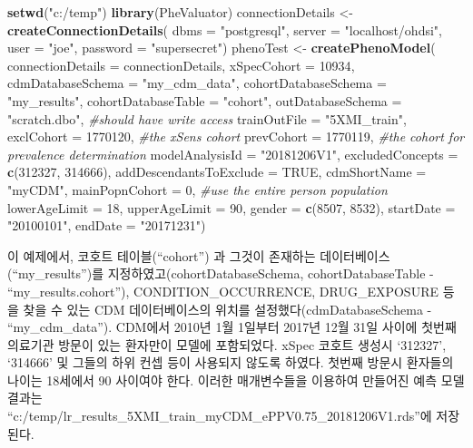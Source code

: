 \documentclass[10.5pt]{book}
\newenvironment{Shaded}{\begin{snugshade}}{\end{snugshade}}
\newcommand{\KeywordTok}[1]{\textcolor[rgb]{0.13,0.29,0.53}{\textbf{#1}}}
\newcommand{\DataTypeTok}[1]{\textcolor[rgb]{0.13,0.29,0.53}{#1}}
\newcommand{\DecValTok}[1]{\textcolor[rgb]{0.00,0.00,0.81}{#1}}
\newcommand{\StringTok}[1]{\textcolor[rgb]{0.31,0.60,0.02}{#1}}
\newcommand{\CommentTok}[1]{\textcolor[rgb]{0.56,0.35,0.01}{\textit{#1}}}
\newcommand{\OtherTok}[1]{\textcolor[rgb]{0.56,0.35,0.01}{#1}}
\newcommand{\NormalTok}[1]{#1}
\theoremstyle{definition}
\theoremstyle{definition}
\theoremstyle{definition}
\theoremstyle{remark}
\begin{document}
\begin{Shaded}
\begin{Highlighting}[]
\KeywordTok{setwd}\NormalTok{(}\StringTok{"c:/temp"}\NormalTok{)}
\KeywordTok{library}\NormalTok{(PheValuator)}
\NormalTok{connectionDetails <-}\StringTok{ }\KeywordTok{createConnectionDetails}\NormalTok{(}
  \DataTypeTok{dbms =} \StringTok{"postgresql"}\NormalTok{,}
  \DataTypeTok{server =} \StringTok{"localhost/ohdsi"}\NormalTok{,}
  \DataTypeTok{user =} \StringTok{"joe"}\NormalTok{,}
  \DataTypeTok{password =} \StringTok{"supersecret"}\NormalTok{)}
\NormalTok{phenoTest <-}\StringTok{ }\KeywordTok{createPhenoModel}\NormalTok{(}
  \DataTypeTok{connectionDetails =}\NormalTok{ connectionDetails,}
  \DataTypeTok{xSpecCohort =} \DecValTok{10934}\NormalTok{,}
  \DataTypeTok{cdmDatabaseSchema =} \StringTok{"my_cdm_data"}\NormalTok{,}
  \DataTypeTok{cohortDatabaseSchema =} \StringTok{"my_results"}\NormalTok{,}
  \DataTypeTok{cohortDatabaseTable =} \StringTok{"cohort"}\NormalTok{,}
  \DataTypeTok{outDatabaseSchema =} \StringTok{"scratch.dbo"}\NormalTok{, }\CommentTok{#should have write access}
  \DataTypeTok{trainOutFile =} \StringTok{"5XMI_train"}\NormalTok{,}
  \DataTypeTok{exclCohort =} \DecValTok{1770120}\NormalTok{, }\CommentTok{#the xSens cohort}
  \DataTypeTok{prevCohort =} \DecValTok{1770119}\NormalTok{, }\CommentTok{#the cohort for prevalence determination}
  \DataTypeTok{modelAnalysisId =} \StringTok{"20181206V1"}\NormalTok{,}
  \DataTypeTok{excludedConcepts =} \KeywordTok{c}\NormalTok{(}\DecValTok{312327}\NormalTok{, }\DecValTok{314666}\NormalTok{),}
  \DataTypeTok{addDescendantsToExclude =} \OtherTok{TRUE}\NormalTok{,}
  \DataTypeTok{cdmShortName =} \StringTok{"myCDM"}\NormalTok{,}
  \DataTypeTok{mainPopnCohort =} \DecValTok{0}\NormalTok{, }\CommentTok{#use the entire person population}
  \DataTypeTok{lowerAgeLimit =} \DecValTok{18}\NormalTok{,}
  \DataTypeTok{upperAgeLimit =} \DecValTok{90}\NormalTok{,}
  \DataTypeTok{gender =} \KeywordTok{c}\NormalTok{(}\DecValTok{8507}\NormalTok{, }\DecValTok{8532}\NormalTok{),}
  \DataTypeTok{startDate =} \StringTok{"20100101"}\NormalTok{,}
  \DataTypeTok{endDate =} \StringTok{"20171231"}\NormalTok{)}
\end{Highlighting}
\end{Shaded}

이 예제에서, 코호트 테이블(``cohort'') 과 그것이 존재하는
데이터베이스(``my\_results'')를 지정하였고(cohortDatabaseSchema,
cohortDatabaseTable - ``my\_results.cohort''), CONDITION\_OCCURRENCE,
DRUG\_EXPOSURE 등을 찾을 수 있는 CDM 데이터베이스의 위치를
설정했다(cdmDatabaseSchema - ``my\_cdm\_data''). CDM에서 2010년 1월
1일부터 2017년 12월 31일 사이에 첫번째 의료기관 방문이 있는 환자만이
모델에 포함되었다. xSpec 코호트 생성시 `312327', `314666' 및 그들의 하위
컨셉 등이 사용되지 않도록 하였다. 첫번째 방문시 환자들의 나이는 18세에서
90 사이여야 한다. 이러한 매개변수들을 이용하여 만들어진 예측 모델 결과는
``c:/temp/lr\_results\_5XMI\_train\_myCDM\_ePPV0.75\_20181206V1.rds''에
저장된다.
\end{document}
